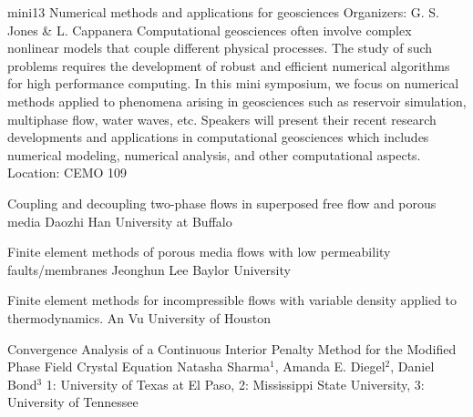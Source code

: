 \mini
{mini13}
{Numerical methods and applications for geosciences}
{Organizers: G. S. Jones \& L. Cappanera}
{Computational geosciences often involve complex nonlinear models that couple different physical processes. The study of such problems requires the development of robust and efficient numerical algorithms for high performance computing. In this mini symposium, we focus on numerical methods applied to phenomena arising in geosciences such as reservoir simulation, multiphase flow, water waves, etc. Speakers will present their recent research developments and applications in computational geosciences which includes numerical modeling, numerical analysis, and other computational aspects.}
{Location: CEMO 109}

\begin{talks}
\item\talk
{Coupling and decoupling two-phase flows in superposed free flow and porous media}
{Daozhi Han}
{University at Buffalo}
\item\talk
{Finite element methods of porous media flows with low permeability faults/membranes}
{Jeonghun Lee}
{Baylor University}
\item\talk
{Finite element methods for incompressible flows with variable density applied to thermodynamics.}
{An Vu}
{University of Houston}
\item\talk
{Convergence Analysis of a Continuous Interior Penalty Method for the Modified Phase Field Crystal Equation}
{Natasha Sharma$^{1}$, Amanda E. Diegel$^{2}$, Daniel Bond$^{3}$}
{1: University of Texas at El Paso, 2: Mississippi State University, 3: University of Tennessee}
\end{talks}
\room
